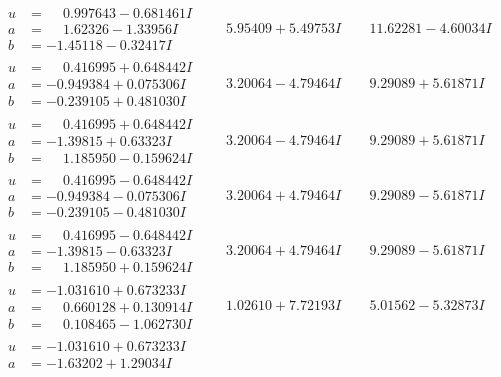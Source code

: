\documentclass[1p]{elsarticle_modified}
\theoremstyle{definition}
\begin{document}
$$\begin{array}{c|c|c}
\begin{aligned}
u &= \phantom{-}0.997643 - 0.681461 I \\
a &= \phantom{-}1.62326 - 1.33956 I \\
b &= -1.45118 - 0.32417 I\end{aligned}
 & \phantom{-}5.95409 + 5.49753 I & \phantom{-}11.62281 - 4.60034 I \\ \hline\begin{aligned}
u &= \phantom{-}0.416995 + 0.648442 I \\
a &= -0.949384 + 0.075306 I \\
b &= -0.239105 + 0.481030 I\end{aligned}
 & \phantom{-}3.20064 - 4.79464 I & \phantom{-}9.29089 + 5.61871 I \\ \hline\begin{aligned}
u &= \phantom{-}0.416995 + 0.648442 I \\
a &= -1.39815 + 0.63323 I \\
b &= \phantom{-}1.185950 - 0.159624 I\end{aligned}
 & \phantom{-}3.20064 - 4.79464 I & \phantom{-}9.29089 + 5.61871 I \\ \hline\begin{aligned}
u &= \phantom{-}0.416995 - 0.648442 I \\
a &= -0.949384 - 0.075306 I \\
b &= -0.239105 - 0.481030 I\end{aligned}
 & \phantom{-}3.20064 + 4.79464 I & \phantom{-}9.29089 - 5.61871 I \\ \hline\begin{aligned}
u &= \phantom{-}0.416995 - 0.648442 I \\
a &= -1.39815 - 0.63323 I \\
b &= \phantom{-}1.185950 + 0.159624 I\end{aligned}
 & \phantom{-}3.20064 + 4.79464 I & \phantom{-}9.29089 - 5.61871 I \\ \hline\begin{aligned}
u &= -1.031610 + 0.673233 I \\
a &= \phantom{-}0.660128 + 0.130914 I \\
b &= \phantom{-}0.108465 - 1.062730 I\end{aligned}
 & \phantom{-}1.02610 + 7.72193 I & \phantom{-}5.01562 - 5.32873 I \\ \hline\begin{aligned}
u &= -1.031610 + 0.673233 I \\
a &= -1.63202 + 1.29034 I \\

\end{aligned}
\end{array}$$
\end{document}
